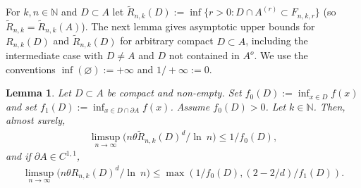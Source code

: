 \documentclass[12pt]{article}
\newcommand{\N}{\mathbb{N}}
\renewcommand{\emptyset}{\varnothing}
\newcommand{\tR}{{\tilde{R}}}
\renewcommand{\log}{{\ln \:}}
\newtheorem{lemm}{Lemma}
\begin{document}
For $k,n \in \N$ and 
$D \subset A$ let $\tR_{n,k} (D) := \inf \{r > 0: D \cap A^{(r)}
\subset F_{n,k,r}\}$
(so $\tR_{n,k} = \tR_{n,k}(A)$).
The next lemma gives asymptotic upper bounds
for $R_{n,k}(D)$
and $\tR_{n,k}(D)$
for arbitrary compact $D \subset A$,
including the intermediate case with $D \neq A$ and $D$  not 
contained in $A^o$. We use the conventions $\inf(\emptyset) := +\infty$
and $1/+\infty :=0$.
\begin{lemm}
	\label{l:upper}
	Let $D \subset A$ be compact and non-empty.
	Set $f_0(D):= \inf_{x \in D} f(x)$ and set $f_1(D) :=
\inf_{x \in D \cap \partial A} f(x)$. 
		Assume $f_0(D) >0$.
	Let $k \in \N$. Then, almost surely,
	\begin{align}
		\limsup_{n\to \infty} \Big( n \theta \tR_{n,k}(D)^d/\log n
		\Big)  \leq 1/f_0(D), 
		\label{e:upper2}
	\end{align}
	and if $\partial A \in C^{1,1}$,
	\begin{align}
	\limsup_{n \to \infty}
		\Big( n \theta R_{n,k}(D)^d/\log n \Big)  
		\leq \max(1/f_0(D), (2-2/d)/f_1(D)). 
		\label{e:upper1}
	\end{align}
\end{lemm}
\end{document}
